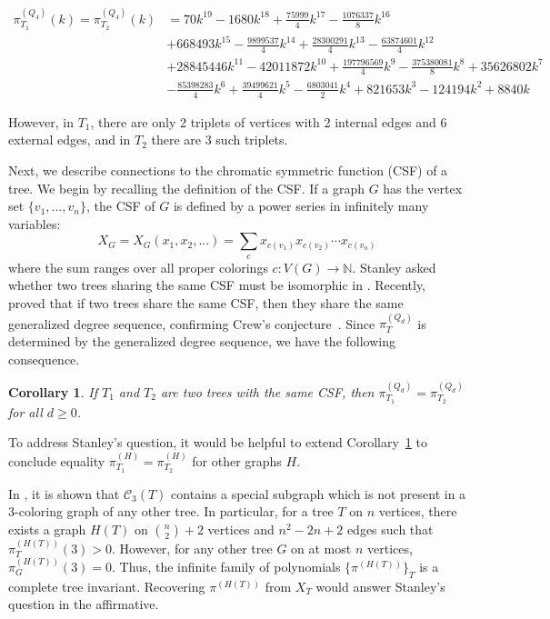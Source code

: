 \documentclass[12pt,reqno,dvipsnames]{amsart}
\newtheorem{cor}[theorem]{Corollary}
\theoremstyle{definition}
\begin{document}
\begin{align*}
\pi_{T_1}^{(Q_4)}(k) = \pi_{T_2}^{(Q_4)}(k) 
&= 70k^{19}-1680k^{18}+\frac{75999}{4}k^{17}-\frac{1076337}{8}k^{16}\\
&+668493k^{15}-\frac{9899537}{4}k^{14}+\frac{28300291}{4}k^{13}-\frac{63874601}{4}k^{12}\\
&+28845446k^{11}-42011872k^{10}+\frac{197796569}{4}k^9-\frac{375380081}{8}k^8+35626802k^7\\
&-\frac{85398283}{4}k^6+\frac{39499621}{4}k^5-\frac{6803041}{2}k^4+821653k^3-124194k^2+8840k
\end{align*}

However, in $T_1$, there are only 2 triplets of vertices with 2 internal edges and 6 external edges, and in $T_2$ there are 3 such triplets.

Next, we describe connections to the chromatic symmetric function (CSF) of a tree. We begin by recalling the definition of the CSF. If a graph $G$ has the vertex set $\{v_1, \ldots, v_n\}$, the CSF of $G$ is defined by a power series in infinitely many variables:
$$
X_G = X_G(x_1, x_2, ...) = \sum_{c} x_{c(v_1)} x_{c(v_2)} \cdots  x_{c(v_n)}
$$
where the sum ranges over all proper colorings $c\colon V(G)\to \mathbb{N}$. Stanley asked whether two trees sharing the same CSF must be isomorphic in \cite{Sta95}. Recently, \cite{APMWZ24} proved that if two trees share the same CSF, then they share the same generalized degree sequence, confirming Crew's conjecture~\cite{Cre20}. Since $\pi_{T}^{(Q_d)}$ is determined by the generalized degree sequence, we have the following consequence.

\begin{cor}\label{cor:CSF:hypercube}
If $T_1$ and $T_2$ are two trees with the same CSF, then $\pi_{T_1}^{(Q_d)} = \pi_{T_2}^{(Q_d)}$ for all $d\geq 0$. 
\end{cor}

To address Stanley's question, it would be helpful to extend Corollary~\ref{cor:CSF:hypercube} to conclude equality $\pi_{T_1}^{(H)} = \pi_{T_2}^{(H)}$ for other graphs $H$. 

In \cite{AKL25}, it is shown that $\mathcal{C}_3(T)$ contains a special subgraph which is not present in a $3$-coloring graph of any other tree. In particular, for a tree $T$ on $n$ vertices, there exists a graph $H(T)$ on $\binom{n}{2}+2$ vertices and $n^2-2n+2$ edges such that $\pi^{(H(T))}_T(3)>0$. However, for any other tree $G$ on at most $n$ vertices, $\pi^{(H(T))}_G(3)=0$. Thus, the infinite family of polynomials $\{\pi^{(H(T))}\}_{T}$ is a complete tree invariant. Recovering $\pi^{(H(T))}$ from $X_T$ would answer Stanley's question in the affirmative.
\end{document}
